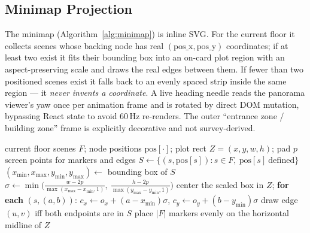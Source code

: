 \subsection{Minimap Projection}
The minimap (Algorithm~\ref{alg:minimap}) is inline SVG. For the current
floor it collects scenes whose backing node has real
$(\text{pos\_x},\text{pos\_y})$ coordinates; if at least two exist it
fits their bounding box into an on-card plot region with an
aspect-preserving scale and draws the real edges between them. If fewer
than two positioned scenes exist it falls back to an evenly spaced strip
inside the same region --- it \emph{never invents a coordinate}. A live
heading needle reads the panorama viewer's yaw once per animation frame and
is rotated by direct DOM mutation, bypassing React state to avoid 60\,Hz
re-renders. The outer ``entrance zone / building zone'' frame is explicitly
decorative and not survey-derived.

\begin{algorithm}[!t]
\caption{Minimap Coordinate Projection}
\label{alg:minimap}
\begin{algorithmic}[1]
\Require current floor scenes $F$; node positions $\text{pos}[\cdot]$; plot rect $Z=(x,y,w,h)$; pad $p$
\Ensure screen points for markers and edges
\State $S \gets \{(s,\text{pos}[s]) : s\in F,\ \text{pos}[s]\ \text{defined}\}$
  \State $(x_{\min},x_{\max},y_{\min},y_{\max}) \gets$ bounding box of $S$
  \State $\sigma \gets \min\!\big(\tfrac{w-2p}{\max(x_{\max}-x_{\min},1)},\ \tfrac{h-2p}{\max(y_{\max}-y_{\min},1)}\big)$
  \State center the scaled box in $Z$; \textbf{for each} $(s,(a,b))$:
         $c_x \gets o_x + (a-x_{\min})\sigma$, $c_y \gets o_y + (b-y_{\min})\sigma$
  \State draw edge $(u,v)$ iff both endpoints are in $S$
\Else
  \State place $|F|$ markers evenly on the horizontal midline of $Z$ 
\EndIf
\end{algorithmic}
\end{algorithm}
